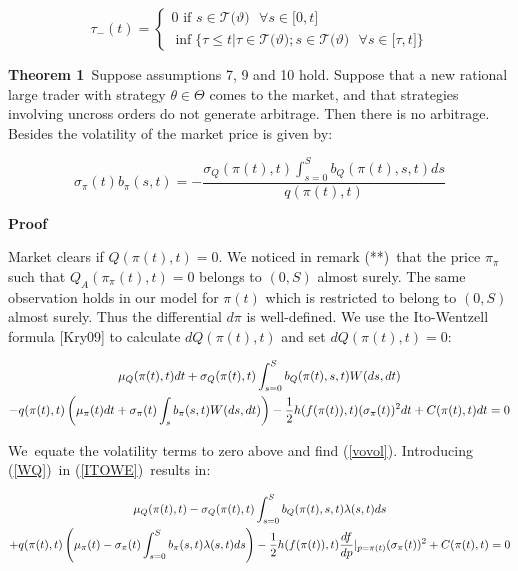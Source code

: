 \documentclass{article}
\begin{document}
\begin{equation*}
\tau _{-}(t)=\left\{ 
\begin{array}{c}
0\text{ if }s\in \mathcal{T(}\vartheta )\text{ }\forall s\in \lbrack 0,t]%
\text{ \ \ \ \ \ \ \ \ \ \ \ \ \ \ \ \ \ \ \ \ \ \ \ } \\ 
\inf \{\tau \leq t|\tau \in \mathcal{T(}\vartheta );s\in \mathcal{T(}%
\vartheta )\text{ }\forall s\in \lbrack \tau ,t]\}%
\end{array}%
\right.
\end{equation*}%
\bigskip

\textbf{Theorem 1}\ Suppose assumptions 7, 9 and 10 hold. Suppose that a new
rational large trader with strategy $\theta \in \Theta $ comes to the
market, and that strategies involving uncross orders do not generate
arbitrage. Then there is no arbitrage. Besides the volatility of the market
price is given by:

\begin{equation}
\sigma _{\pi }(t)b_{\pi }(s,t)=-\frac{\sigma _{Q}(\pi
(t),t)\int_{s=0}^{S}b_{Q}(\pi (t),s,t)ds}{q(\pi (t),t)}  \label{vovol}
\end{equation}

\textbf{Proof }

Market clears if $Q(\pi (t),t)=0$. We noticed in remark (**)\ that the price 
$\pi _{\pi }$ such that $Q_{A}(\pi _{\pi }(t),t)=0$ belongs to $(0,S)$
almost surely. The same observation holds in our model for $\pi (t)$ which
is restricted to belong to $(0,S)$ almost surely. Thus the differential $%
d\pi $ is well-defined. We use the Ito-Wentzell formula [Kry09] to calculate 
$dQ(\pi (t),t)$ and set $dQ(\pi (t),t)=0$:

\begin{gather}
\mu _{Q}(\pi (t),t)dt+\sigma _{Q}(\pi (t),t)\int_{s=0}^{S}b_{Q}(\pi
(t),s,t)W(ds,dt)  \label{ITOWE} \\
-q(\pi (t),t)\left( \mu _{\pi }(t)dt+\sigma _{\pi }(t)\int_{s}b_{\pi
}(s,t)W(ds,dt)\right) -\frac{1}{2}h(f(\pi (t)),t)(\sigma _{\pi
}(t))^{2}dt+C(\pi (t),t)dt=0  \notag
\end{gather}

We\ equate the volatility terms to zero above and find (\ref{vovol}).
Introducing (\ref{WQ})\ in (\ref{ITOWE})\ results in:

\begin{gather}
\mu _{Q}(\pi (t),t)-\sigma _{Q}(\pi (t),t)\int_{s=0}^{S}b_{Q}(\pi
(t),s,t)\lambda (s,t)ds \\
+q(\pi (t),t)\left( \mu _{\pi }(t)-\sigma _{\pi }(t)\int_{s=0}^{S}b_{\pi
}(s,t)\lambda (s,t)ds\right) -\frac{1}{2}h(f(\pi (t)),t)\frac{df}{dp}%
|_{p=\pi (t)}(\sigma _{\pi }(t))^{2}+C(\pi (t),t)=0  \notag
\end{gather}%
\bigskip
\end{document}
